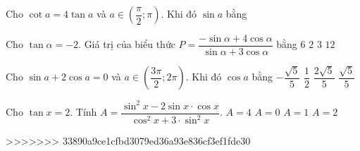 \begin{ex}%
	Cho $\cot a = 4\tan a$  và $a\in\left(\dfrac{\pi}{2};\pi\right)$. Khi đó $\sin a$  bằng
\end{ex}
\begin{ex}%
	Cho $\tan \alpha = - 2$. Giá trị của biểu thức $P = \dfrac{- \sin \alpha + 4 \cos \alpha}{\sin \alpha + 3 \cos \alpha}$ bằng
	\choice
	{\True $6$}
	{$2$}
	{$3$}
	{$12$}
\end{ex}

\begin{ex}%
	Cho $\sin a +2\cos a =0$  và $a\in\left(\dfrac{3\pi}{2};2\pi\right)$. Khi đó $\cos a$  bằng
	\choice
	{\True $ - \dfrac{{\sqrt 5 }}{5}$}
	{$\dfrac{1}{2}$}
	{$\dfrac{{2\sqrt 5 }}{5}$}
	{ $\dfrac{{\sqrt 5 }}{5}$}
\end{ex}
\begin{ex}%
	Cho $ \tan x = 2 $. Tính $ A = \dfrac{{\sin^2}x - 2\sin x\cdot\cos x}{{\cos^2}x + 3\cdot{\sin^2}x} $.
	\choice
	{$A = 4$}
	{\True$A = 0$}
	{$A = 1$}
	{$A = 2$}
\end{ex}


>>>>>>> 33890a9ce1cfbd3079ed36a93e836cf3ef1fde30
